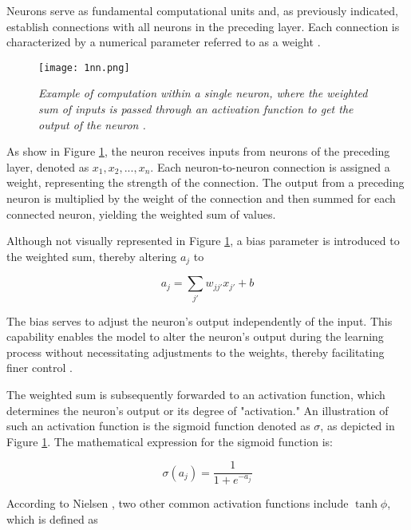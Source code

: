 Neurons serve as fundamental computational units and, as previously indicated, establish connections with all neurons in the preceding layer. Each connection is characterized by a numerical parameter referred to as a weight \cite{lipton2015critical}.


\begin{figure}[H]
    \centering
    \texttt{[image: 1nn.png]}
    \caption{
        \it{Example of computation within a single neuron, where the weighted sum
            of inputs is passed through an activation function to get the output of the neuron \cite{lipton2015critical}.}
    }
    \label{fig:1nn}
\end{figure}

As show in Figure \ref{fig:1nn}, the neuron receives inputs from neurons of the preceding layer, denoted as \(x_1, x_2, ..., x_n\). Each neuron-to-neuron connection is assigned a weight, representing the strength of the connection. The output from a preceding neuron is multiplied by the weight of the connection and then summed for each connected neuron, yielding the weighted sum of values.

Although not visually represented in Figure \ref{fig:1nn}, a bias parameter is introduced to the weighted sum, thereby altering \(a_j\) to

\begin{equation}
    a_j = \sum_{j'} w_{jj'}x_{j'} + b
\end{equation}

The bias serves to adjust the neuron's output independently of the input. This capability enables the model to alter the neuron's output during the learning process without necessitating adjustments to the weights, thereby facilitating finer control \cite{nnanddl}.

The weighted sum is subsequently forwarded to an activation function, which determines the neuron's output or its degree of "activation." An illustration of such an activation function is the sigmoid function denoted as \(\sigma\), as depicted in Figure \ref{fig:1nn}. The mathematical expression for the sigmoid function is:

\begin{equation}
    \sigma(a_j) = \frac{1}{1+e^{-a_j}}
\end{equation}

According to Nielsen \cite{nnanddl}, two other common activation functions include \(\tanh \phi\),
which is defined as

